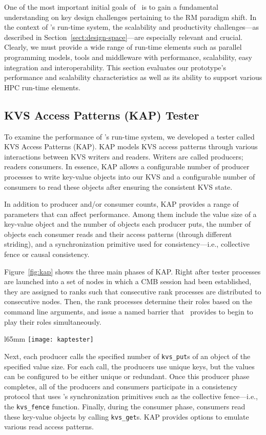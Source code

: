 One of the most important initial goals of \flux\ is to gain
a fundamental understanding on key design challenges pertaining
to the RM paradigm shift.
In the context of \flux's run-time system, the scalability
and productivity challenges---as described
in Section~\ref{sect:design-space}---are especially
relevant and crucial. Clearly, we  must provide a wide range
of run-time elements such as parallel programming models,
tools and middleware with performance, scalability, easy integration
and interoperability.
This section evaluates our prototype's performance
and scalability characteristics as well as its ability
to support various HPC run-time elements.


\subsection{KVS Access Patterns (KAP) Tester}
To examine the performance of \flux's run-time system,
we developed a tester called KVS Access Patterns (KAP).
KAP models KVS access patterns through various interactions
between KVS writers and readers. Writers are called producers;
readers consumers.
In essence, KAP allows a configurable number of producer processes
to write key-value objects into our KVS 
and a configurable number of consumers to read these
objects after ensuring the consistent KVS state.

In addition to producer and/or consumer counts,
KAP provides a range of parameters that can affect performance.
Among them include the value size of a key-value object
and the number of objects each producer puts,
the number of objects each consumer reads and their
access patterns (through different striding), and
a synchronization primitive used for consistency---i.e., 
collective fence or causal consistency. 

Figure~\ref{fig:kap} shows the three main phases of KAP.
Right after tester processes are launched into a set of nodes
in which a CMB session had been established,
they are assigned to ranks such that consecutive rank
processes are distributed to consecutive nodes.
Then, the rank processes determine their roles based
on the command line arguments, and issue a named barrier
that \flux\ provides to begin to play their roles
simultaneously.

\begin{wrapfigure}{l}{65mm}
  \centering
  \texttt{[image: kaptester]}
  \caption{Main phases of KAP tester}
  \label{fig:kap}
\end{wrapfigure}


Next, each producer calls the specified number of
{\tt kvs\_put}s of an object of the specified value size.
For each call, the producers use unique keys, but
the values can be configured to be either unique
or redundant.
Once this producer phase completes, all of the producers and consumers
participate in a consistency protocol that uses
\flux's synchronization primitives such as the collective
fence---i.e., the {\tt kvs\_fence} function.
Finally, during the consumer phase, consumers read
these key-value objects by calling {\tt kvs\_get}s.
KAP provides options to emulate various read access
patterns.

